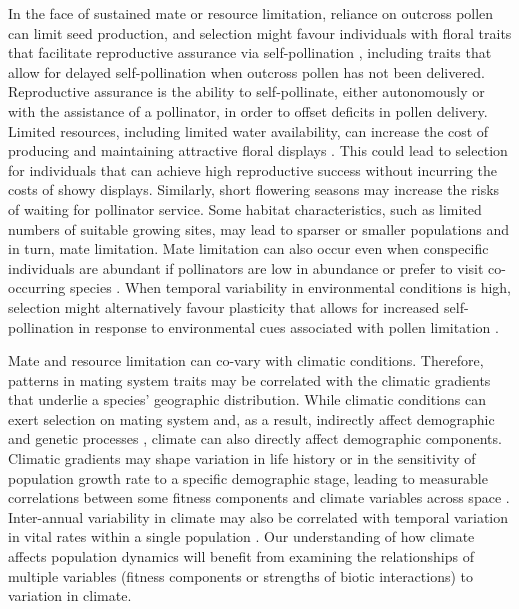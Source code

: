\documentclass{article}
\begin{document}
In the face of sustained mate or resource limitation, reliance on outcross pollen can limit seed production, and selection might favour individuals with floral traits that facilitate reproductive assurance via self-pollination \citep{bodbyl2011rapid}, including traits that allow for delayed self-pollination when outcross pollen has not been delivered. Reproductive assurance is the ability to self-pollinate, either autonomously or with the assistance of a pollinator, in order to offset deficits in pollen delivery. Limited resources, including limited water availability, can increase the cost of producing and maintaining attractive floral displays \citep{galen1999flowers}. This could lead to selection for individuals that can achieve high reproductive success without incurring the costs of showy displays. Similarly, short flowering seasons may increase the risks of waiting for pollinator service. Some habitat characteristics, such as limited numbers of suitable growing sites, may lead to sparser or smaller populations and in turn, mate limitation. Mate limitation can also occur even when conspecific individuals are abundant if pollinators are low in abundance or prefer to visit co-occurring species \citep{knight2005pollen}. When temporal variability in environmental conditions is high, selection might alternatively favour plasticity that allows for increased self-pollination in response to environmental cues associated with pollen limitation \citep{kay2013drought}. 

Mate and resource limitation can co-vary with climatic conditions. Therefore, patterns in mating system traits may be correlated with the climatic gradients that underlie a species' geographic distribution. While climatic conditions can exert selection on mating system and, as a result, indirectly affect demographic \citep{lennartsson2002extinction, moeller2005ecologicalcontext} and genetic processes \citep{eckert2010plant, kramer2011influences}, climate can also directly affect demographic components. Climatic gradients may shape variation in life history or in the sensitivity of population growth rate to a specific demographic stage, leading to measurable correlations between some fitness components and climate variables across space \citep{doak2010demographic}. Inter-annual variability in climate may also be correlated with temporal variation in vital rates within a single population \citep{coulson2001age}. Our understanding of how climate affects population dynamics will benefit from examining the relationships of multiple variables (fitness components or strengths of biotic interactions) to variation in climate.
\end{document}
